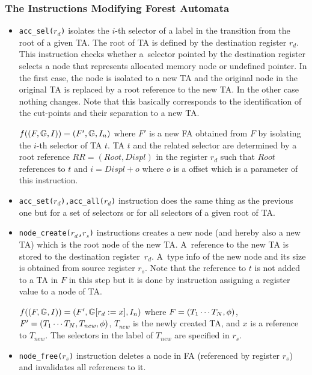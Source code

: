 \subsubsection{The Instructions Modifying Forest Automata}
\begin{itemize}
	\item {\tt acc\_sel($r_d$)} isolates the $i$-th selector of a label
		in the transition from the root of a given TA.
		The root of TA is defined by the destination register $r_d$.
		This instruction checks whether a~selector pointed by the destination register
		selects a node that represents allocated memory node or undefined pointer.
		In the first case, the node is isolated to a new TA and the original node in the
		original TA is replaced by a root reference to the new TA.
		In the other case nothing changes.
		Note that this basically corresponds to the identification of the cut-points
		and their separation to a new TA.
		
		$f((F, \mathbb{G}, I)) = (F', \mathbb{G}, I_n)$
		where $F'$ is a new FA obtained from $F$ by isolating
		the $i$-th selector of TA $t$.
		TA $t$ and the related selector are determined by a root reference $RR=(Root, Displ)$
		in the register $r_d$ such that $Root$ references to $t$ and $i=Displ+o$
		where $o$ is a offset which is a parameter of this instruction.

	\item {\tt acc\_set($r_d$),acc\_all($r_d$)} instruction does the same thing as the previous one
		but for a set of selectors or for all selectors of a given root of TA.
	
	\item {\tt node\_create($r_d$,$r_s$)} instructions creates a new node
		(and hereby also a new TA) which is the root node of the new TA.
		A~reference to the new TA is stored to the destination register~$r_d$.
		A~type info of the new node and its size is obtained from source
		register $r_s$.
		Note that the reference to $t$ is not added to a TA in $F$ in this step
		but it is done by instruction assigning a register value to a
		node of TA.
		
		$f((F, \mathbb{G}, I)) = (F', 
		\mathbb{G} [
			r_{d} := x], I_n)$
		where $F=(T_1 \cdots T_N, \phi)$, $F'=(T_1 \cdots T_N, T_{\mathit{new}}, \phi)$,
		$T_{\mathit{new}}$ is the newly created TA,
		and $x$ is a reference to $T_{\mathit{new}}$.
		The selectors in the label of $T_{\mathit{new}}$ are specified in $r_s$. 
	
	\item {\tt node\_free($r_s$)} instruction deletes a node in FA (referenced by register $r_s$) and
		invalidates all references to it.
		

\end{itemize}
